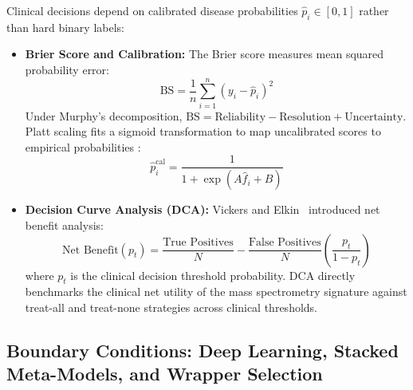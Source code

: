 \documentclass[11pt,oneside]{book}
\begin{document}
Clinical decisions depend on calibrated disease probabilities $\hat{p}_i \in [0, 1]$ rather than hard binary labels:
\begin{itemize}
    \item \textbf{Brier Score and Calibration:} The Brier score measures mean squared probability error:
    \begin{equation}
    \text{BS} = \frac{1}{n} \sum_{i=1}^n (y_i - \hat{p}_i)^2
    \end{equation}
    Under Murphy's decomposition, $\text{BS} = \text{Reliability} - \text{Resolution} + \text{Uncertainty}$. Platt scaling fits a sigmoid transformation to map uncalibrated scores to empirical probabilities \cite{platt1999probabilistic}:
    \begin{equation}
    \hat{p}_i^{\text{cal}} = \frac{1}{1 + \exp(A \hat{f}_i + B)}
    \end{equation}
    \item \textbf{Decision Curve Analysis (DCA):} Vickers and Elkin~\cite{vickers2006decision} introduced net benefit analysis:
    \begin{equation}
    \text{Net Benefit}(p_t) = \frac{\text{True Positives}}{N} - \frac{\text{False Positives}}{N} \left( \frac{p_t}{1 - p_t} \right)
    \end{equation}
    where $p_t$ is the clinical decision threshold probability. DCA directly benchmarks the clinical net utility of the mass spectrometry signature against treat-all and treat-none strategies across clinical thresholds.
\end{itemize}

\subsection{Boundary Conditions: Deep Learning, Stacked Meta-Models, and Wrapper Selection}
\end{document}
